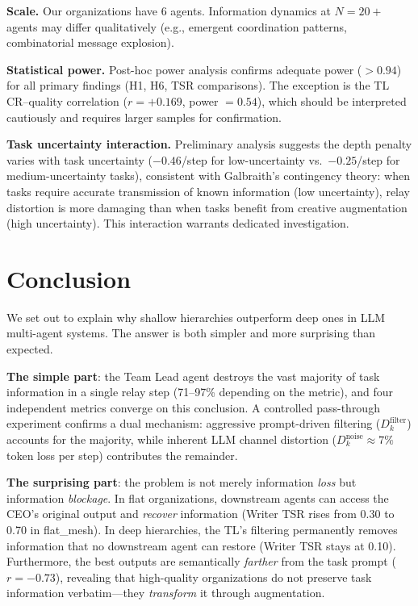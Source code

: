 \documentclass[conference]{IEEEtran}
\begin{document}
\textbf{Scale.}
Our organizations have 6 agents.
Information dynamics at $N = 20+$ agents may differ qualitatively (e.g., emergent coordination patterns, combinatorial message explosion).

\textbf{Statistical power.}
Post-hoc power analysis confirms adequate power ($> 0.94$) for all primary findings (H1, H6, TSR comparisons).
The exception is the TL CR--quality correlation ($r = +0.169$, power $= 0.54$), which should be interpreted cautiously and requires larger samples for confirmation.

\textbf{Task uncertainty interaction.}
Preliminary analysis suggests the depth penalty varies with task uncertainty ($-0.46$/step for low-uncertainty vs.\ $-0.25$/step for medium-uncertainty tasks), consistent with Galbraith's contingency theory: when tasks require accurate transmission of known information (low uncertainty), relay distortion is more damaging than when tasks benefit from creative augmentation (high uncertainty).
This interaction warrants dedicated investigation.

\section{Conclusion}
\label{sec:conclusion}

We set out to explain why shallow hierarchies outperform deep ones in LLM multi-agent systems.
The answer is both simpler and more surprising than expected.

\textbf{The simple part}: the Team Lead agent destroys the vast majority of task information in a single relay step (71--97\% depending on the metric), and four independent metrics converge on this conclusion.
A controlled pass-through experiment confirms a dual mechanism: aggressive prompt-driven filtering ($D_k^{\text{filter}}$) accounts for the majority, while inherent LLM channel distortion ($D_k^{\text{noise}} \approx 7\%$ token loss per step) contributes the remainder.

\textbf{The surprising part}: the problem is not merely information \emph{loss} but information \emph{blockage}.
In flat organizations, downstream agents can access the CEO's original output and \emph{recover} information (Writer TSR rises from 0.30 to 0.70 in flat\_mesh).
In deep hierarchies, the TL's filtering permanently removes information that no downstream agent can restore (Writer TSR stays at 0.10).
Furthermore, the best outputs are semantically \emph{farther} from the task prompt ($r = -0.73$), revealing that high-quality organizations do not preserve task information verbatim---they \emph{transform} it through augmentation.
\end{document}
